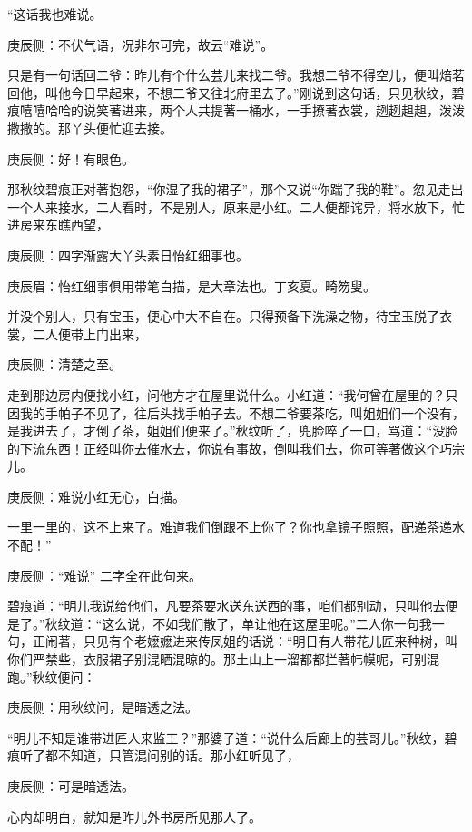 \begin{parag}
    “这话我也难说。\begin{note}庚辰侧：不伏气语，况非尔可完，故云“难说”。\end{note}只是有一句话回二爷：昨儿有个什么芸儿来找二爷。我想二爷不得空儿，便叫焙茗回他，叫他今日早起来，不想二爷又往北府里去了。”刚说到这句话，只见秋纹，碧痕嘻嘻哈哈的说笑著进来，两个人共提著一桶水，一手撩著衣裳，趔趔趄趄，泼泼撒撒的。那丫头便忙迎去接。\begin{note}庚辰侧：好！有眼色。\end{note}那秋纹碧痕正对著抱怨，“你湿了我的裙子”，那个又说“你踹了我的鞋”。忽见走出一个人来接水，二人看时，不是别人，原来是小红。二人便都诧异，将水放下，忙进房来东瞧西望，\begin{note}庚辰侧：四字渐露大丫头素日怡红细事也。\end{note}\begin{note}庚辰眉：怡红细事俱用带笔白描，是大章法也。丁亥夏。畸笏叟。\end{note}并没个别人，只有宝玉，便心中大不自在。只得预备下洗澡之物，待宝玉脱了衣裳，二人便带上门出来，\begin{note}庚辰侧：清楚之至。\end{note}
\end{parag}


\begin{parag}
    走到那边房内便找小红，问他方才在屋里说什么。小红道：“我何曾在屋里的？只因我的手帕子不见了，往后头找手帕子去。不想二爷要茶吃，叫姐姐们一个没有，是我进去了，才倒了茶，姐姐们便来了。”秋纹听了，兜脸啐了一口，骂道：“没脸的下流东西！正经叫你去催水去，你说有事故，倒叫我们去，你可等著做这个巧宗儿。\begin{note}庚辰侧：难说小红无心，白描。\end{note}一里一里的，这不上来了。难道我们倒跟不上你了？你也拿镜子照照，配递茶递水不配！”\begin{note}庚辰侧：“难说” 二字全在此句来。\end{note}碧痕道：“明儿我说给他们，凡要茶要水送东送西的事，咱们都别动，只叫他去便是了。”秋纹道：“这么说，不如我们散了，单让他在这屋里呢。”二人你一句我一句，正闹著，只见有个老嬷嬷进来传凤姐的话说：“明日有人带花儿匠来种树，叫你们严禁些，衣服裙子别混晒混晾的。那土山上一溜都都拦著帏幙呢，可别混跑。”秋纹便问：\begin{note}庚辰侧：用秋纹问，是暗透之法。\end{note}“明儿不知是谁带进匠人来监工？”那婆子道：“说什么后廊上的芸哥儿。”秋纹，碧痕听了都不知道，只管混问别的话。那小红听见了，\begin{note}庚辰侧：可是暗透法。\end{note}心内却明白，就知是昨儿外书房所见那人了。
\end{parag}


